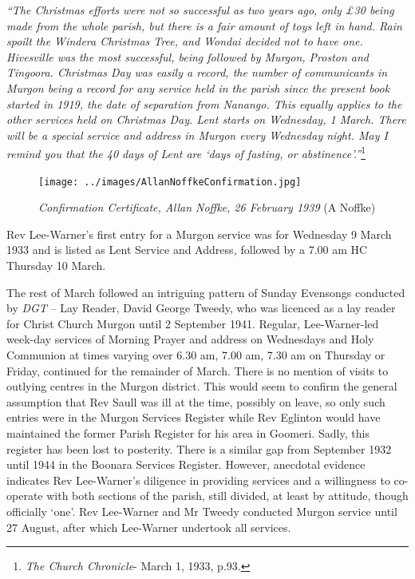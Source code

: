 \emph{``The Christmas efforts were not so successful as two years ago, only \pounds30 being made from the whole parish, but there is a fair amount of toys left in hand. Rain spoilt the Windera Christmas Tree, and Wondai decided not to have one. Hivesville was the most successful, being followed by Murgon, Proston and Tingoora. Christmas Day was easily a record, the number of communicants in Murgon being a record for any service held in the parish since the present book started in 1919, the date of separation from Nanango. This equally applies to the other services held on Christmas Day. Lent starts on Wednesday, 1 March. There will be a special service and address in Murgon every Wednesday night. May I remind you that the 40 days of Lent are `days of fasting, or abstinence'.''}\footnote{\emph{The Church Chronicle}- March 1, 1933, p.93.}


\medskip








\begin{figure}[!htb]
\begin{center}
\texttt{[image: ../images/AllanNoffkeConfirmation.jpg]}
\caption{{\itshape Confirmation Certificate, Allan Noffke, 26 February 1939} {\scriptsize(A Noffke)}}
\end{center}
\end{figure}




Rev Lee-Warner's first entry for a Murgon service was for Wednesday 9 March 1933 and is listed as Lent Service and Address\emph{,} followed by a 7.00 am HC Thursday 10 March.



The rest of March followed an intriguing pattern of Sunday Evensongs conducted by \emph{DGT} -- Lay Reader, David George Tweedy, who was licenced as a lay reader for Christ Church Murgon until 2 September 1941. Regular, Lee-Warner-led week-day services of Morning Prayer and address on Wednesdays and Holy Communion at times varying over 6.30 am, 7.00 am, 7.30 am on Thursday or Friday, continued for the remainder of March. There is no mention of visits to outlying centres in the Murgon district. This would seem to confirm the general assumption that Rev Saull was ill at the time, possibly on leave, so only such entries were in the Murgon Services Register while Rev Eglinton would have maintained the former Parish Register for his area in Goomeri. Sadly, this register has been lost to posterity. There is a similar gap from September 1932 until 1944 in the Boonara Services Register. However, anecdotal evidence indicates Rev Lee-Warner's diligence in providing services and a willingness to co-operate with both sections of the parish, still divided, at least by attitude, though officially `one'. Rev Lee-Warner and Mr Tweedy conducted Murgon service until 27 August, after which Lee-Warner undertook all services.



